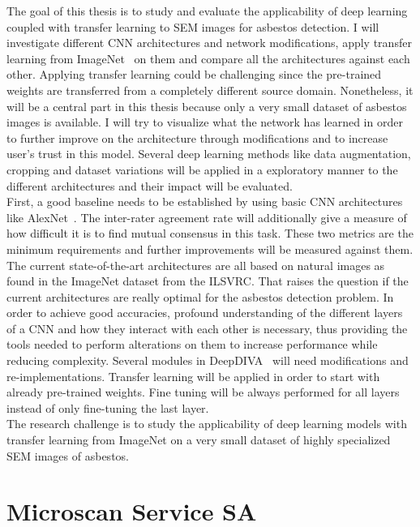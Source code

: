 The goal of this thesis is to study and evaluate the applicability of deep learning coupled with transfer learning to SEM images for asbestos detection. I will investigate different CNN architectures and network modifications, apply transfer learning from ImageNet~\cite{imagenet} on them and compare all the architectures against each other. Applying transfer learning could be challenging since the pre-trained weights are transferred from a completely different source domain. Nonetheless, it will be a central part in this thesis because only a very small dataset of asbestos images is available. I will try to visualize what the network has learned in order to further improve on the architecture through modifications and to increase user's trust in this model. Several deep learning methods like data augmentation, cropping and dataset variations will be applied in a exploratory manner to the different architectures and their impact will be evaluated. \\

First, a good baseline needs to be established by using basic CNN architectures like AlexNet~\cite{krizhevsky2012imagenet}. The inter-rater agreement rate will additionally give a measure of how difficult it is to find mutual consensus in this task. These two metrics are the minimum requirements and further improvements will be measured against them. The current state-of-the-art architectures are all based on natural images as found in the ImageNet dataset from the ILSVRC. That raises the question if the current architectures are really optimal for the asbestos detection problem. In order to achieve good accuracies, profound understanding of the different layers of a CNN and how they interact with each other is necessary, thus providing the tools needed to perform alterations on them to increase performance while reducing complexity. Several modules in DeepDIVA~\cite{deepdiva} will need modifications and re-implementations. Transfer learning will be applied in order to start with already pre-trained weights. Fine tuning will be always performed for all layers instead of only fine-tuning the last layer.\\

The research challenge is to study the applicability of deep learning models with transfer learning from ImageNet on a very small dataset of highly specialized SEM images of asbestos.\\

\section{Microscan Service SA}

